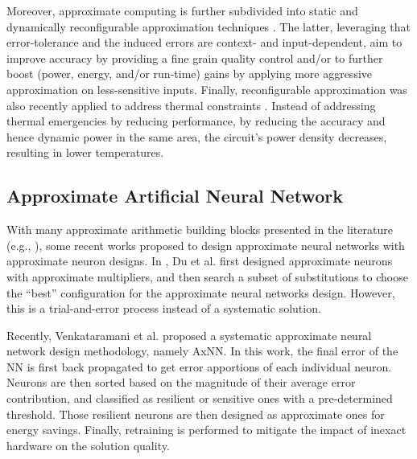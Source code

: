 Moreover, approximate computing is further subdivided into static and dynamically reconfigurable approximation techniques \cite{zervakis2021approximate}. The latter, leveraging that error-tolerance and the induced errors are context- and input-dependent, aim to improve accuracy by providing a fine grain quality control and/or to further boost (power, energy, and/or run-time) gains by applying more aggressive approximation on less-sensitive inputs. Finally, reconfigurable approximation was also recently applied to address thermal constraints \cite{amrouch2020npu}. Instead of addressing thermal emergencies by reducing performance, by reducing the accuracy and hence dynamic power in the same area, the circuit’s power density decreases, resulting in lower temperatures.

\subsection{Approximate Artificial Neural Network}

With many approximate arithmetic building blocks presented in the literature (e.g., \cite{miao2012modeling, shafique2015low, zervakis2019vader, saadat2018minimally}), some recent works proposed to design approximate neural networks with approximate neuron designs. In \cite{du2014leveraging}, Du et al. first designed approximate neurons with approximate multipliers, and then search a subset of substitutions to choose the “best” configuration for the approximate neural networks design. However, this is a trial-and-error process instead of a systematic solution.

Recently, Venkataramani et al. \cite{venkataramani2014axnn} proposed a systematic approximate neural network design methodology, namely AxNN. In this work, the final error of the NN is first back propagated to get error apportions of each individual neuron. Neurons are then sorted based on the magnitude of their average error contribution, and classified as resilient or sensitive ones with a pre-determined threshold. Those resilient neurons are then designed as approximate ones for energy savings. Finally, retraining is performed to mitigate the impact of inexact hardware on the solution quality.